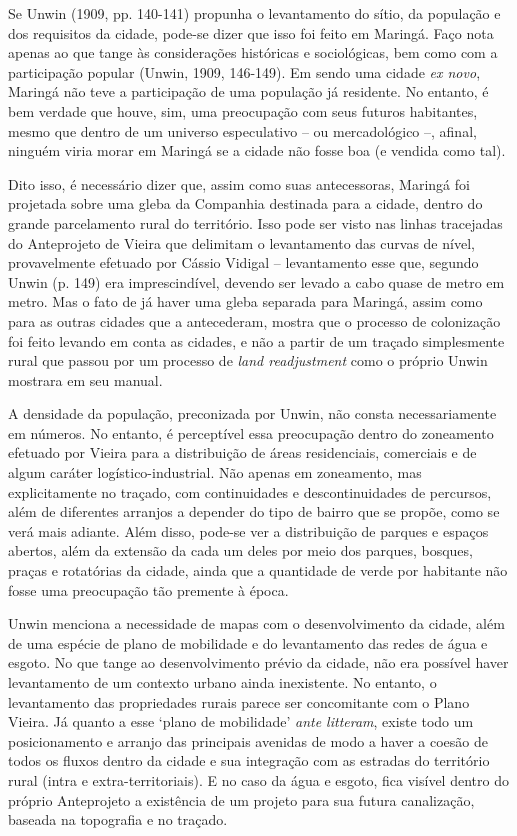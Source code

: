 \documentclass[12pt, a4paper]{book} %
\begin{document}
        Se Unwin (1909, pp. 140-141) propunha o levantamento do sítio, da população e dos requisitos da cidade, pode-se dizer que isso foi feito em Maringá. Faço nota apenas ao que tange às considerações históricas e sociológicas, bem como com a participação popular (Unwin, 1909, 146-149). Em sendo uma cidade \textit{ex novo}, Maringá não teve a participação de uma população já residente. No entanto, é bem verdade que houve, sim, uma preocupação com seus futuros habitantes, mesmo que dentro de um universo especulativo – ou mercadológico –, afinal, ninguém viria morar em Maringá se a cidade não fosse boa (e vendida como tal).

        Dito isso, é necessário dizer que, assim como suas antecessoras, Maringá foi projetada sobre uma gleba da Companhia destinada para a cidade, dentro do grande parcelamento rural do território. Isso pode ser visto nas linhas tracejadas do Anteprojeto de Vieira que delimitam o levantamento das curvas de nível, provavelmente efetuado por Cássio Vidigal – levantamento esse que, segundo Unwin (p. 149) era imprescindível, devendo ser levado a cabo quase de metro em metro. Mas o fato de já haver uma gleba separada para Maringá, assim como para as outras cidades que a antecederam, mostra que o processo de colonização foi feito levando em conta as cidades, e não a partir de um traçado simplesmente rural que passou por um processo de \textit{land readjustment} como o próprio Unwin mostrara em seu manual.

        A densidade da população, preconizada por Unwin, não consta necessariamente em números. No entanto, é perceptível essa preocupação dentro do zoneamento efetuado por Vieira para a distribuição de áreas residenciais, comerciais e de algum caráter logístico-industrial. Não apenas em zoneamento, mas explicitamente no traçado, com continuidades e descontinuidades de percursos, além de diferentes arranjos a depender do tipo de bairro que se propõe, como se verá mais adiante. Além disso, pode-se ver a distribuição de parques e espaços abertos, além da extensão da cada um deles por meio dos parques, bosques, praças e rotatórias da cidade, ainda que a quantidade de verde por habitante não fosse uma preocupação tão premente à época.

        Unwin menciona a necessidade de mapas com o desenvolvimento da cidade, além de uma espécie de plano de mobilidade e do levantamento das redes de água e esgoto. No que tange ao desenvolvimento prévio da cidade, não era possível haver levantamento de um contexto urbano ainda inexistente. No entanto, o levantamento das propriedades rurais parece ser concomitante com o Plano Vieira. Já quanto a esse `plano de mobilidade' \textit{ante litteram}, existe todo um posicionamento e arranjo das principais avenidas de modo a haver a coesão de todos os fluxos dentro da cidade e sua integração com as estradas do território rural (intra e extra-territoriais). E no caso da água e esgoto, fica visível dentro do próprio Anteprojeto a existência de um projeto para sua futura canalização, baseada na topografia e no traçado.
\end{document}
